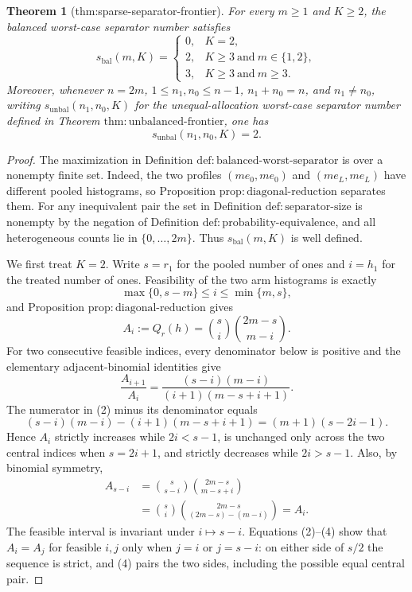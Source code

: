 \documentclass{article}
\newtheorem{theorem}{Theorem}
\begin{document}
\begin{theorem}[thm:sparse-separator-frontier]\label{thm:sparse-separator-frontier}
For every \(m\geq1\) and \(K\geq2\), the balanced worst-case separator number satisfies
\[
s_{\mathrm{bal}}(m,K)=
\begin{cases}
0,&K=2,\\
2,&K\geq3\ \text{and}\ m\in\{1,2\},\\
3,&K\geq3\ \text{and}\ m\geq3.
\end{cases}
\]
Moreover, whenever \(n=2m\), \(1\leq n_1,n_0\leq n-1\), \(n_1+n_0=n\), and \(n_1\neq n_0\), writing \(s_{\mathrm{unbal}}(n_1,n_0,K)\) for the unequal-allocation worst-case separator number defined in Theorem \(\mathrm{thm{:}unbalanced\text{-}frontier}\), one has
\[
s_{\mathrm{unbal}}(n_1,n_0,K)=2.
\]
\end{theorem}
\begin{proof}
The maximization in Definition \(\mathrm{def{:}balanced\text{-}worst\text{-}separator}\) is over a nonempty finite set. Indeed, the two profiles \((me_0,me_0)\) and \((me_L,me_L)\) have different pooled histograms, so Proposition \(\mathrm{prop{:}diagonal\text{-}reduction}\) separates them. For any inequivalent pair the set in Definition \(\mathrm{def{:}separator\text{-}size}\) is nonempty by the negation of Definition \(\mathrm{def{:}probability\text{-}equivalence}\), and all heterogeneous counts lie in \(\{0,\ldots,2m\}\). Thus \(s_{\mathrm{bal}}(m,K)\) is well defined.

We first treat \(K=2\). Write \(s=r_1\) for the pooled number of ones and \(i=h_1\) for the treated number of ones. Feasibility of the two arm histograms is exactly
\[
\max\{0,s-m\}\leq i\leq\min\{m,s\},
\]
and Proposition \(\mathrm{prop{:}diagonal\text{-}reduction}\) gives
\[
A_i:=Q_r(h)=\binom{s}{i}\binom{2m-s}{m-i}. \tag{1}
\]
For two consecutive feasible indices, every denominator below is positive and the elementary adjacent-binomial identities give
\[
\frac{A_{i+1}}{A_i}
=
\frac{(s-i)(m-i)}
{(i+1)(m-s+i+1)}. \tag{2}
\]
The numerator in (2) minus its denominator equals
\[
(s-i)(m-i)-(i+1)(m-s+i+1)
=(m+1)(s-2i-1). \tag{3}
\]
Hence \(A_i\) strictly increases while \(2i<s-1\), is unchanged only across the two central indices when \(s=2i+1\), and strictly decreases while \(2i>s-1\). Also, by binomial symmetry,
\[
\begin{aligned}
A_{s-i}
&=\binom{s}{s-i}\binom{2m-s}{m-s+i}\\
&=\binom{s}{i}\binom{2m-s}{(2m-s)-(m-i)}
=A_i. \tag{4}
\end{aligned}
\]
The feasible interval is invariant under \(i\mapsto s-i\). Equations (2)--(4) show that \(A_i=A_j\) for feasible \(i,j\) only when \(j=i\) or \(j=s-i\): on either side of \(s/2\) the sequence is strict, and (4) pairs the two sides, including the possible equal central pair.


\end{proof}
\end{document}
